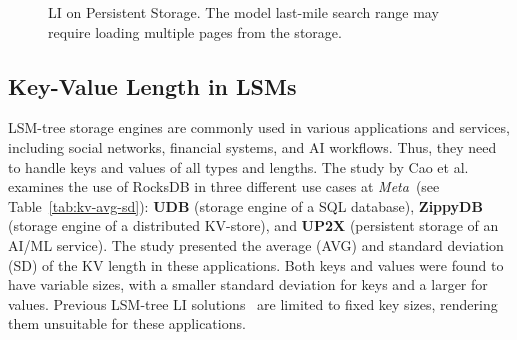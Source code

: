 \begin{figure}[t]
  \centering
  \vspace{-1.6em}
  \caption{\small{LI on Persistent Storage. The model last-mile search range may require loading multiple pages from the storage.}}
  \label{fig:li-storage}
  \vspace{-0.5em}
\end{figure}

\subsection{Key-Value Length in LSMs}
\label{sec:var-kv-lsm}
LSM-tree storage engines are commonly used in various applications and services, including social networks, financial systems, and AI workflows. Thus, they need to handle keys and values of all types and lengths. The study by Cao et al. \cite{modelrocksdb2020} examines the use of RocksDB in three different use cases at \textit{Meta}~(see Table~\ref{tab:kv-avg-sd}): \textbf{UDB} (storage engine of a SQL database), \textbf{ZippyDB} (storage engine of a distributed KV-store), and \textbf{UP2X} (persistent storage of an AI/ML service). The study presented the average (AVG) and standard deviation (SD) of the KV length in these applications. Both keys and values were found to have variable sizes, with a smaller standard deviation for keys and a larger for values. Previous LSM-tree LI solutions~\cite{Bourbon2020, TridentKV2022, leaderkv2024, wang2024learnedkv} are limited to fixed key sizes, rendering them unsuitable for these applications.

\begin{table}[]
\centering
\caption{\small{AVG and SD of key-values (in bytes) on RocksDB use cases on UDB, ZippyDB, and UP2X.}}
\vspace{-0.5em}
\label{tab:kv-avg-sd}
\vspace{-1em}
\end{table}

